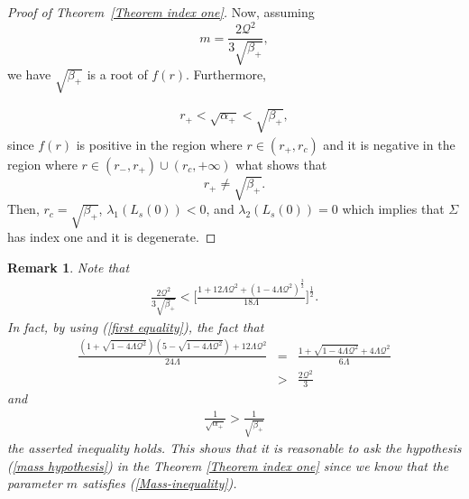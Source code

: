 \documentclass[a4paper, 11pt, reqno]{amsart}
\newtheorem{remark}{Remark}
\begin{document}
\begin{proof}[Proof of Theorem~\ref{Theorem index one}]
Now, assuming 
     \begin{equation*}
       m=  \frac{2\mathcal{Q}^2}{3\sqrt{\beta_{+}}},
     \end{equation*}
     we have $\sqrt{\beta_{+}}$ is a root of $f(r)$. Furthermore,
     
      \begin{eqnarray*}
         r_+<\sqrt{\alpha_{+}}<\sqrt{\beta_{+}},
     \end{eqnarray*}
     since $f(r)$ is positive in the region where $r\in(r_+,r_c)$ and it is negative in the region where $r\in(r_{-},r_{+})\cup(r_c,+\infty)$ what shows that
     \begin{equation*}
         r_+\neq\sqrt{\beta_{+}}.
     \end{equation*}
Then, $r_c=\sqrt{\beta_{+}}$, $\lambda_1(L_s(0))<0$, and $\lambda_2(L_s(0))=0$ which implies that $\Sigma$ has index one and it is degenerate.
\end{proof}

\begin{remark}
Note that
 \begin{eqnarray*}
     \frac{2\mathcal{Q}^2}{3\sqrt{\beta_{+}}}<\Bigg[\frac{1+12\Lambda\mathcal{Q}^2+(1-4\Lambda\mathcal{Q}^2)^{\frac{3}{2}}}{18\Lambda}\Bigg]^{\frac{1}{2}}.
 \end{eqnarray*}
In fact, by using (\ref{first equality}), the fact that
 \begin{eqnarray*}
\frac{(1+\sqrt{1-4\Lambda\mathcal{Q}^2})(5-\sqrt{1-4\Lambda\mathcal{Q}^2})+12\Lambda\mathcal{Q}^2}{24\Lambda}&=&
\frac{1+\sqrt{1-4\Lambda\mathcal{Q}^2}+4\Lambda\mathcal{Q}^2}{6\Lambda}\\
&>&\frac{2\mathcal{Q}^2}{3}
 \end{eqnarray*}
 and
 \begin{eqnarray*}
    \frac{1}{\sqrt{\alpha_{+}}}>\frac{1}{\sqrt{\beta_{+}}}
 \end{eqnarray*}
 the asserted inequality holds. This shows that it is reasonable to ask the hypothesis (\ref{mass hypothesis})
 in the Theorem \ref{Theorem index one} since we know that the parameter $m$ satisfies (\ref{Mass-inequality}).
 \end{remark}
\end{document}
